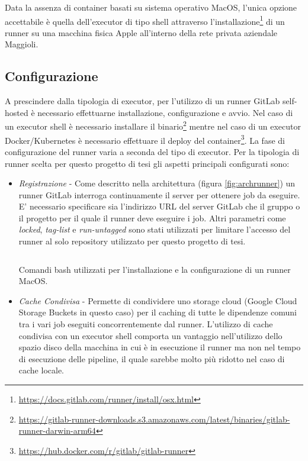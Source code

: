 Data la assenza di container basati su sistema operativo MacOS, l'unica opzione accettabile è quella dell'executor di tipo shell attraverso l'installazione\footnote{\url{https://docs.gitlab.com/runner/install/osx.html}} di un runner su una macchina fisica Apple all'interno della rete privata aziendale Maggioli.

\subsection{Configurazione}
A prescindere dalla tipologia di executor, per l'utilizzo di un runner GitLab self-hosted è necessario effettuarne installazione, configurazione e avvio. Nel caso di un executor shell è necessario installare il binario\footnote{\url{https://gitlab-runner-downloads.s3.amazonaws.com/latest/binaries/gitlab-runner-darwin-arm64}} mentre nel caso di un executor Docker/Kubernetes è necessario effettuare il deploy del container\footnote{\url{https://hub.docker.com/r/gitlab/gitlab-runner}}. La fase di configurazione del runner varia a seconda del tipo di executor. Per la tipologia di runner scelta per questo progetto di tesi gli aspetti principali configurati sono:
\begin{itemize}
    \item \textit{Registrazione} - Come descritto nella architettura (figura \ref{fig:archrunner}) un runner GitLab interroga continuamente il server per ottenere job da eseguire. E' necessario specificare sia l'indirizzo URL del server GitLab che il gruppo o il progetto per il quale il runner deve eseguire i job. Altri parametri come \textit{locked}, \textit{tag-list} e \textit{run-untagged} sono stati utilizzati per limitare l'accesso del runner al solo repository utilizzato per questo progetto di tesi.
    \begin{listing}[H]
    \inputminted{bash}{code/4-macos-runner-setup}
    \caption{Comandi bash utilizzati per l'installazione e la configurazione di un runner MacOS.}
    \end{listing}
    \item \textit{Cache Condivisa} - Permette di condividere uno storage cloud (Google Cloud Storage Buckets in questo caso) per il caching di tutte le dipendenze comuni tra i vari job eseguiti concorrentemente dal runner. L'utilizzo di cache condivisa con un executor shell comporta un vantaggio nell'utilizzo dello spazio disco della macchina in cui è in esecuzione il runner ma non nel tempo di esecuzione delle pipeline, il quale sarebbe molto più ridotto nel caso di cache locale.
\end{itemize}

